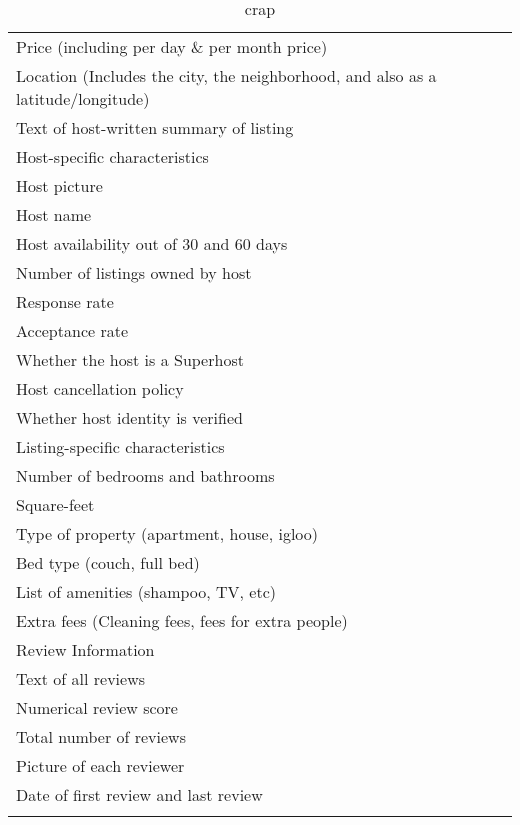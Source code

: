 \documentclass[11pt, oneside]{article}
\begin{document}
{
\def\sym#1{\ifmmode^{#1}\else\(^{#1}\)\fi}
\begin{longtable}{l*{1}{c}}
\caption{testing}\\
\hline\hline\endfirsthead\hline\endhead\hline\endfoot\endlastfoot

\hline

Price (including per day \& per month price) \\
[1em]
Location (Includes the city, the neighborhood, and also as a latitude/longitude) \\
[1em]
Text of host-written summary of listing \\
\hline\hline
Host-specific characteristics \\
[1em]
Host picture\\ 
[1em]
Host name\\
[1em]
Host availability out of 30 and 60 days\\
[1em]
Number of listings owned by host\\
[1em]
Response rate\\
[1em]
Acceptance rate\\
[1em]
Whether the host is a Superhost \\
[1em]
Host cancellation policy\\
[1em]
Whether host identity is verified \\

\hline\hline
Listing-specific characteristics \\
\hline
Number of bedrooms and bathrooms \\
[1em]
Square-feet \\
[1em]
Type of property (apartment, house, igloo)\\
[1em]
Bed type (couch, full bed)\\
[1em]
List of amenities (shampoo, TV, etc)\\
[1em]
Extra fees (Cleaning fees, fees for extra people) \\

\hline\hline
Review Information \\
\hline
Text of all reviews \\
[1em]
Numerical review score \\
[1em]
Total number of reviews \\
[1em]
Picture of each reviewer \\
[1em]
Date of first review and last review \\

\hline\hline
\caption*{crap}



\end{longtable}
}
\end{document}
